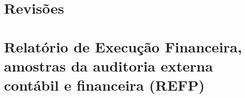 \documentclass[a4paper,11pt,oneside,brazilian,
draft=false]{report}%
\begin{document}


%



% 



%



%
 

\chapter{Revisões}
















\chapter{Relatório de Execução Financeira, amostras da auditoria externa
contábil e financeira (REFP)}

\end{document}
